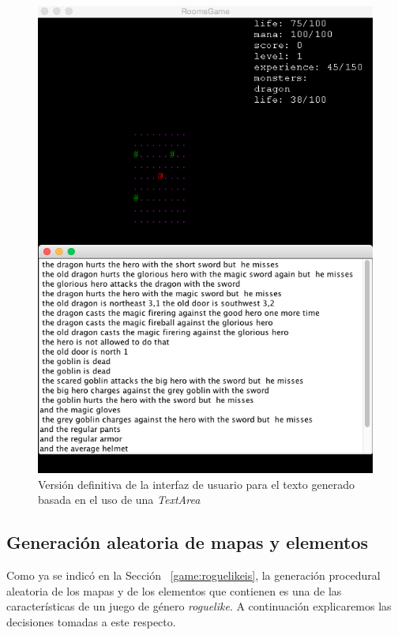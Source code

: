 \begin{figure}
    \includegraphics[width=\textwidth,height=\textheight,keepaspectratio]{./img/lastiterationui.png}
  \caption{Versión definitiva de la interfaz de usuario para el texto generado basada en el uso de una \textit{TextArea}}
  \label{fig:lastiterationui}
\end{figure}

\subsection{Generación aleatoria de mapas y elementos}

Como ya se indicó en la Sección ~\ref{game:roguelikeis}, la generación procedural aleatoria de los mapas y de los elementos que contienen \cite{Betts2014a} es una de las características de un juego de género \textit{roguelike}. A continuación explicaremos las decisiones tomadas a este respecto.

